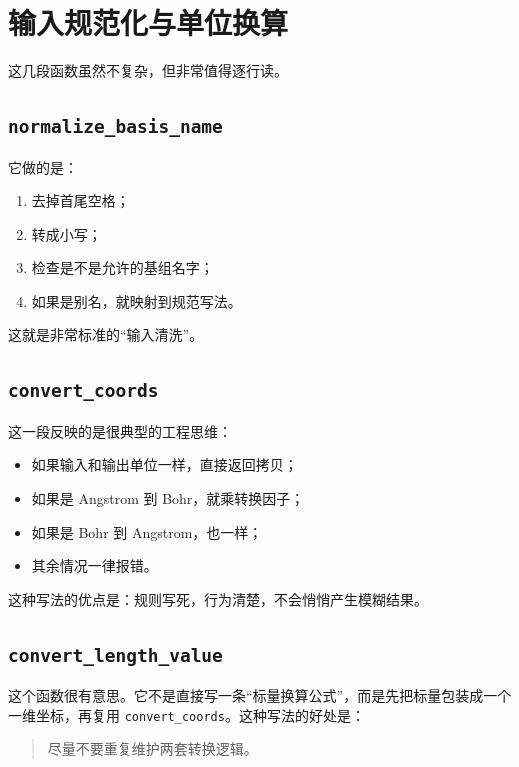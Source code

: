 \documentclass[UTF8,11pt,fontset=fandol]{ctexbook}
\begin{document}
\section{输入规范化与单位换算}



这几段函数虽然不复杂，但非常值得逐行读。

\subsection*{\texttt{normalize\_basis\_name}}

它做的是：
\begin{enumerate}[label=\arabic*.]
  \item 去掉首尾空格；
  \item 转成小写；
  \item 检查是不是允许的基组名字；
  \item 如果是别名，就映射到规范写法。
\end{enumerate}

这就是非常标准的“输入清洗”。

\subsection*{\texttt{convert\_coords}}

这一段反映的是很典型的工程思维：
\begin{itemize}
  \item 如果输入和输出单位一样，直接返回拷贝；
  \item 如果是 Angstrom 到 Bohr，就乘转换因子；
  \item 如果是 Bohr 到 Angstrom，也一样；
  \item 其余情况一律报错。
\end{itemize}

这种写法的优点是：规则写死，行为清楚，不会悄悄产生模糊结果。

\subsection*{\texttt{convert\_length\_value}}

这个函数很有意思。它不是直接写一条“标量换算公式”，而是先把标量包装成一个一维坐标，再复用 \texttt{convert\_coords}。这种写法的好处是：

\begin{quote}
尽量不要重复维护两套转换逻辑。
\end{quote}
\end{document}
